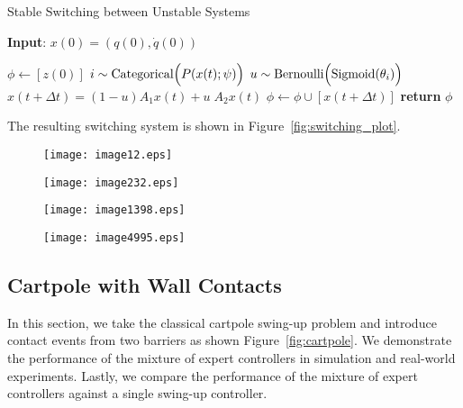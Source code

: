 \begin{algorithm}
      \caption{Stable Switching between Unstable Systems}
      \label{algo:switching_A1A2}
      \small
      \hspace*{\algorithmicindent} \textbf{Input}: $x(0) = (q(0), \dot{q}(0))$
      \begin{algorithmic}[1]
        \State $\phi \leftarrow  [z(0)]$ 
              \State $i \sim \text{Categorical}\Bigl(P(x(t); \psi)\Bigr)$ 
              \State $u \sim \text{Bernoulli} \Bigl(\textrm{Sigmoid}(\theta_i) \Bigr)$      
              \State $x(t+\Delta t) = (1-u)A_1x(t) + u \; A_2x(t) $
              \State $\phi \leftarrow \phi \cup [x(t+\Delta t)]$
            \EndFor
          \State \textbf{return} $\phi$
      \end{algorithmic}
  \end{algorithm}
  
The resulting switching system is shown in Figure~\ref{fig:switching_plot}.

\begin{figure}[H]
    \centering
    \texttt{[image: image12.eps]}
    \label{fig:training1}
\end{figure}

\begin{figure}[H]
    \centering
    \texttt{[image: image232.eps]}
    \label{fig:training1}
\end{figure}
\begin{figure}[H]
    \centering
    \texttt{[image: image1398.eps]}
    \label{fig:training1}
\end{figure}
\begin{figure}[H]
    \centering
    \texttt{[image: image4995.eps]}
    \label{fig:training1}
\end{figure}
\subsection{Cartpole with Wall Contacts}
\label{ssec:cartpole_with_walls}

In this section, we take the classical cartpole swing-up problem and introduce
contact events from two barriers as shown Figure~\ref{fig:cartpole}. 
%
We demonstrate the performance of the mixture of expert controllers in
simulation and real-world experiments.
%
Lastly, we compare the performance of the mixture of expert controllers against
a single swing-up controller. 


